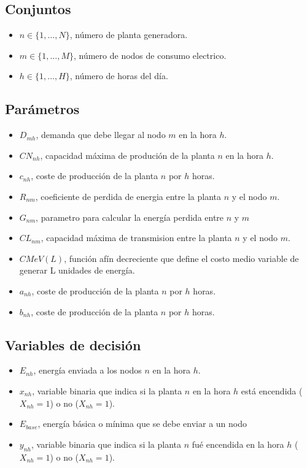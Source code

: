 \documentclass{article}
\begin{document}
\begin{flushleft}
			

		\subsection{Conjuntos}
		\begin{itemize}
			\item $n \in \{1, \ldots, N\}$, número de planta generadora.
			\item $m \in \{1, \ldots, M\}$, número de nodos de consumo electrico.
			\item $h \in \{1, \ldots, H\}$, número de horas del día.
		\end{itemize}
		
		\subsection{Parámetros}
		\begin{itemize}
			\item $D_{mh}$, demanda que debe llegar al nodo $m$ en la hora $h$.
			\item $CN_{nh}$, capacidad máxima de produción de la planta $n$ en la hora $h$.
			\item $c_{nh}$, coste de producción de la planta $n$ por $h$ horas. 
			\item $R_{nm}$, coeficiente de perdida de energia entre la planta $n$ y el nodo $m$.
			\item $G_{nm}$, parametro para calcular la energía perdida entre $n$ y $m$
			\item $CL_{nm}$, capacidad máxima de transmision entre la planta $n$ y el nodo $m$. 
			\item $CMeV(L)$, función afín decreciente que define el costo medio variable de generar L unidades de energía. 
			\item $a_{nh}$, coste de producción de la planta $n$ por $h$ horas. 
			\item $b_{nh}$, coste de producción de la planta $n$ por $h$ horas. 
		\end{itemize}
		\subsection{Variables de decisión} 
		\begin{itemize}
			\item $E_{nh}$, energía enviada a los nodos $n$ en la hora $h$.
			\item $x_{nh}$, variable binaria que indica si la planta $n$ en la hora $h$ está encendida ($X_{nh} = 1$) o no ($X_{nh} = 1$).
			\item $E_{base}$, energía básica o mínima que se debe enviar a un nodo
			\item $y_{nh}$, variable binaria que indica si la planta $n$ fué encendida en la hora $h$ ($X_{nh} = 1$) o no ($X_{nh} = 1$).
		\end{itemize}

\end{flushleft}
\end{document}
